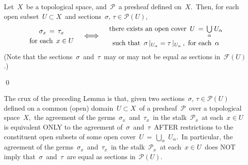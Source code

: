 \vskip 0.5cm
\begin{lemma}
\mbox{}\vskip 0.1cm
\noindent
Let \,$X$\, be a topological space, and \,$\mathscr{P}$\, a presheaf defined on \,$X$.\,
Then, for each open subset \,$U \subset X$\, and sections \,$\sigma,\, \tau \in \mathscr{P}(U)$,\,
\begin{equation*}
\begin{array}{c}
\textnormal{$\sigma_{x} \,=\, \tau_{x}$}
\\
\overset{{\color{white}.}}{\textnormal{for each \,$x \in U$}}
\end{array}
\quad
\textnormal{\large$\Longleftrightarrow$}
\quad
\begin{array}{c}
\textnormal{there exists an open cover \,$U \,=\, \underset{\alpha}{\bigcup}\;U_{\alpha}$}
\\
\overset{{\color{white}.}}{\textnormal{such that \,$\sigma\,\vert_{U_{\alpha}} = \tau\,\vert_{U_{\alpha}}$\,,\, for each \,$\alpha$}}
\end{array}
\end{equation*}
(Note that the sections \,$\sigma$\, and \,$\tau$\, may or may not be equal as sections in \,$\mathscr{F}(U)$.)
\end{lemma}
\proof

\qed

\begin{remark}
\mbox{}\vskip 0.1cm
\noindent
The crux of the preceding Lemma is that, given two sections
\,$\sigma, \,\tau \in \mathscr{P}(U)$\,
defined on a common (open) domain \,$U \subset X$\,
of a presheaf \,$\mathscr{P}$\, over a topological space \,$X$,\,
the agreement of the germs \,$\sigma_{x}$\, and \,$\tau_{x}$\, in the stalk \,$\mathscr{P}_{x}$\, at each \,$x \in U$\,
is equivalent ONLY to the agreement of
\,$\sigma$\, and \,$\tau$\,
AFTER restrictions to the constituent open subsets of some open cover
\,$U \,=\, \underset{\alpha}{\bigcup}\;U_{\alpha}$.\,
In particular,
the agreement of the germs \,$\sigma_{x}$\, and \,$\tau_{x}$\, in the stalk \,$\mathscr{P}_{x}$\, at each \,$x \in U$\,
does NOT imply that
\,$\sigma$\, and \,$\tau$\, are equal as sections in \,$\mathscr{P}(U)$.
\end{remark}


